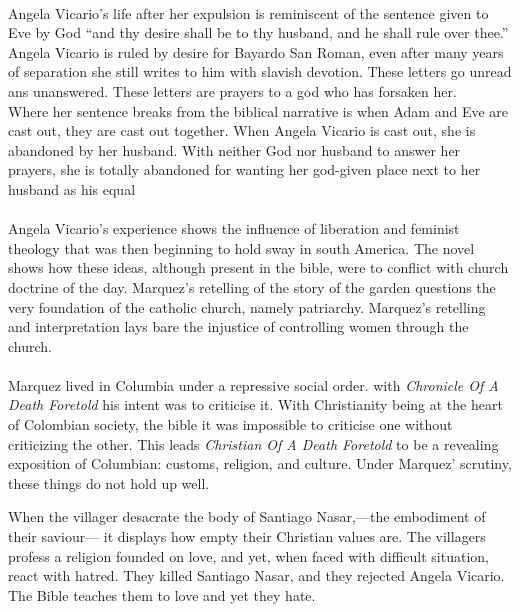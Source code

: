 \documentclass[11pt,a4wide]{article}
\begin{document}
\paragraph{} Angela Vicario's life after her expulsion is reminiscent of the 
sentence given to Eve by God ``and thy desire shall be to thy husband, and he 
shall rule over thee.\cite[Genesis 3:16]{bible}'' Angela Vicario is ruled by 
desire for Bayardo San Roman, even after many years of separation she still 
writes to him with slavish devotion. These letters go unread ans unanswered. 
These letters are prayers to a god who has forsaken her.\\
Where her sentence breaks from the biblical narrative is when Adam and Eve
are cast out, they are cast out together. When Angela Vicario is cast out, she 
is abandoned by her husband. With neither God nor husband to answer her prayers,
she is totally abandoned for wanting her god-given place next to her husband as
his equal

\paragraph{} Angela Vicario's experience shows the influence of liberation and feminist 
theology that was then beginning to hold sway in south America. \cite{lib-theo} The novel
shows how these ideas, although present in the bible, were to conflict
with church doctrine of the day. Marquez's retelling of the story of the garden
questions the very foundation of the catholic church, namely patriarchy.
Marquez's retelling and interpretation lays bare the injustice of controlling
women through the church.

\paragraph{} Marquez lived in Columbia under a repressive social order.
with \emph{Chronicle Of A Death Foretold} his intent was to criticise it. 
With Christianity being at the heart of Colombian society, the bible 
it was impossible to criticise one without criticizing the other.
This leads \emph{Christian Of A Death Foretold} to be a revealing
exposition of Columbian: customs, religion, and culture.
Under Marquez' scrutiny, these things do not hold up well.

When the villager desacrate the body of Santiago Nasar,---the embodiment of their saviour---
it displays how empty their Christian values are.
The villagers profess a religion founded on love,
and yet, when faced with difficult situation, react with hatred. They killed Santiago Nasar,
and they rejected Angela Vicario. The Bible teaches them to love
and yet they hate.
\end{document}
